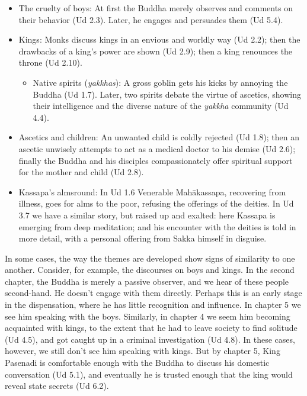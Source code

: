 \documentclass[12pt,openany]{book}%
\begin{document}
\begin{itemize}%
\item The cruelty of boys: At first the Buddha merely observes and comments on their behavior (Ud 2.3). Later, he engages and persuades them (Ud 5.4).%
\item Kings: Monks discuss kings in an envious and worldly way (Ud 2.2); then the drawbacks of a king’s power are shown (Ud 2.9); then a king renounces the throne (Ud 2.10).\begin{itemize}%
\item Native spirits (\textit{yakkhas}): A gross goblin gets his kicks by annoying the Buddha (Ud 1.7). Later, two spirits debate the virtue of ascetics, showing their intelligence and the diverse nature of the \textit{yakkha} community (Ud 4.4).%
\end{itemize}

%
\item Ascetics and children: An unwanted child is coldly rejected (Ud 1.8); then an ascetic unwisely attempts to act as a medical doctor to his demise (Ud 2.6); finally the Buddha and his disciples compassionately offer spiritual support for the mother and child (Ud 2.8).%
\item Kassapa’s almsround: In Ud 1.6  Venerable \textsanskrit{Mahākassapa}, recovering from illness, goes for alms to the poor, refusing the offerings of the deities. In Ud 3.7  we have a similar story, but raised up and exalted: here Kassapa is emerging from deep meditation; and his encounter with the deities is told in more detail, with a personal offering from Sakka himself in disguise.%
\end{itemize}

In some cases, the way the themes are developed show signs of similarity to one another. Consider, for example, the discourses on boys and kings. In the second chapter, the Buddha is merely a passive observer, and we hear of these people second-hand. He doesn’t engage with them directly. Perhaps this is an early stage in the dispensation, where he has little recognition and influence. In chapter 5 we see him speaking with the boys. Similarly, in chapter 4 we seem him becoming acquainted with kings, to the extent that he had to leave society to find solitude (Ud 4.5), and got caught up in a criminal investigation (Ud 4.8). In these cases, however, we still don’t see him speaking with kings. But by chapter 5, King Pasenadi is comfortable enough with the Buddha to discuss his domestic conversation (Ud 5.1), and eventually he is trusted enough that the king would reveal state secrets (Ud 6.2). 
\end{document}
